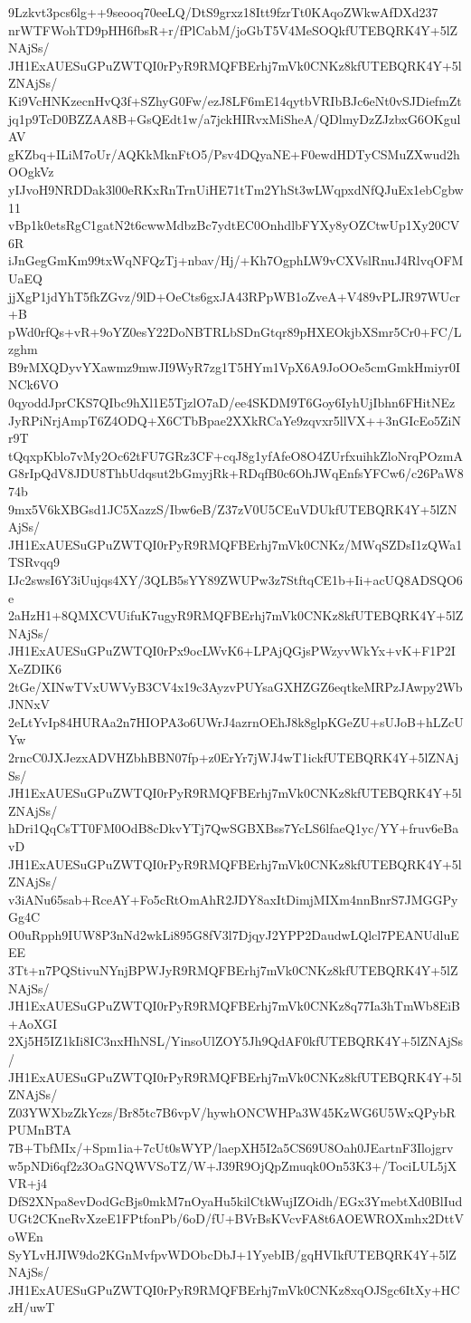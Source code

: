 9Lzkvt3pcs6lg++9seooq70eeLQ/DtS9grxz18Itt9fzrTt0KAqoZWkwAfDXd237
nrWTFWohTD9pHH6fbsR+r/fPlCabM/joGbT5V4MeSOQkfUTEBQRK4Y+5lZNAjSs/
JH1ExAUESuGPuZWTQI0rPyR9RMQFBErhj7mVk0CNKz8kfUTEBQRK4Y+5lZNAjSs/
Ki9VcHNKzecnHvQ3f+SZhyG0Fw/ezJ8LF6mE14qytbVRIbBJc6eNt0vSJDiefmZt
jq1p9TcD0BZZAA8B+GsQEdt1w/a7jckHIRvxMiSheA/QDlmyDzZJzbxG6OKgulAV
gKZbq+ILiM7oUr/AQKkMknFtO5/Psv4DQyaNE+F0ewdHDTyCSMuZXwud2hOOgkVz
yIJvoH9NRDDak3l00eRKxRnTrnUiHE71tTm2YhSt3wLWqpxdNfQJuEx1ebCgbw11
vBp1k0etsRgC1gatN2t6cwwMdbzBc7ydtEC0OnhdlbFYXy8yOZCtwUp1Xy20CV6R
iJnGegGmKm99txWqNFQzTj+nbav/Hj/+Kh7OgphLW9vCXVslRnuJ4RlvqOFMUaEQ
jjXgP1jdYhT5fkZGvz/9lD+OeCts6gxJA43RPpWB1oZveA+V489vPLJR97WUcr+B
pWd0rfQs+vR+9oYZ0esY22DoNBTRLbSDnGtqr89pHXEOkjbXSmr5Cr0+FC/Lzghm
B9rMXQDyvYXawmz9mwJI9WyR7zg1T5HYm1VpX6A9JoOOe5cmGmkHmiyr0INCk6VO
0qyoddJprCKS7QIbc9hXl1E5TjzlO7aD/ee4SKDM9T6Goy6IyhUjIbhn6FHitNEz
JyRPiNrjAmpT6Z4ODQ+X6CTbBpae2XXkRCaYe9zqvxr5llVX++3nGIcEo5ZiNr9T
tQqxpKblo7vMy2Oc62tFU7GRz3CF+cqJ8g1yfAfeO8O4ZUrfxuihkZloNrqPOzmA
G8rIpQdV8JDU8ThbUdqsut2bGmyjRk+RDqfB0c6OhJWqEnfsYFCw6/c26PaW874b
9mx5V6kXBGsd1JC5XazzS/Ibw6eB/Z37zV0U5CEuVDUkfUTEBQRK4Y+5lZNAjSs/
JH1ExAUESuGPuZWTQI0rPyR9RMQFBErhj7mVk0CNKz/MWqSZDsI1zQWa1TSRvqq9
IJc2swsI6Y3iUujqs4XY/3QLB5sYY89ZWUPw3z7StftqCE1b+Ii+acUQ8ADSQO6e
2aHzH1+8QMXCVUifuK7ugyR9RMQFBErhj7mVk0CNKz8kfUTEBQRK4Y+5lZNAjSs/
JH1ExAUESuGPuZWTQI0rPx9ocLWvK6+LPAjQGjsPWzyvWkYx+vK+F1P2IXeZDIK6
2tGe/XINwTVxUWVyB3CV4x19c3AyzvPUYsaGXHZGZ6eqtkeMRPzJAwpy2WbJNNxV
2eLtYvIp84HURAa2n7HIOPA3o6UWrJ4azrnOEhJ8k8glpKGeZU+sUJoB+hLZcUYw
2rncC0JXJezxADVHZbhBBN07fp+z0ErYr7jWJ4wT1ickfUTEBQRK4Y+5lZNAjSs/
JH1ExAUESuGPuZWTQI0rPyR9RMQFBErhj7mVk0CNKz8kfUTEBQRK4Y+5lZNAjSs/
hDri1QqCsTT0FM0OdB8cDkvYTj7QwSGBXBss7YcLS6lfaeQ1yc/YY+fruv6eBavD
JH1ExAUESuGPuZWTQI0rPyR9RMQFBErhj7mVk0CNKz8kfUTEBQRK4Y+5lZNAjSs/
v3iANu65sab+RceAY+Fo5cRtOmAhR2JDY8axItDimjMIXm4nnBnrS7JMGGPyGg4C
O0uRpph9IUW8P3nNd2wkLi895G8fV3l7DjqyJ2YPP2DaudwLQlcl7PEANUdluEEE
3Tt+n7PQStivuNYnjBPWJyR9RMQFBErhj7mVk0CNKz8kfUTEBQRK4Y+5lZNAjSs/
JH1ExAUESuGPuZWTQI0rPyR9RMQFBErhj7mVk0CNKz8q77Ia3hTmWb8EiB+AoXGI
2Xj5H5IZ1kIi8IC3nxHhNSL/YinsoUlZOY5Jh9QdAF0kfUTEBQRK4Y+5lZNAjSs/
JH1ExAUESuGPuZWTQI0rPyR9RMQFBErhj7mVk0CNKz8kfUTEBQRK4Y+5lZNAjSs/
Z03YWXbzZkYczs/Br85tc7B6vpV/hywhONCWHPa3W45KzWG6U5WxQPybRPUMnBTA
7B+TbfMIx/+Spm1ia+7cUt0sWYP/laepXH5I2a5CS69U8Oah0JEartnF3Ilojgrv
w5pNDi6qf2z3OaGNQWVSoTZ/W+J39R9OjQpZmuqk0On53K3+/TociLUL5jXVR+j4
DfS2XNpa8evDodGcBjs0mkM7nOyaHu5kilCtkWujIZOidh/EGx3YmebtXd0BlIud
UGt2CKneRvXzeE1FPtfonPb/6oD/fU+BVrBsKVcvFA8t6AOEWROXmhx2DttVoWEn
SyYLvHJIW9do2KGnMvfpvWDObcDbJ+1YyebIB/gqHVIkfUTEBQRK4Y+5lZNAjSs/
JH1ExAUESuGPuZWTQI0rPyR9RMQFBErhj7mVk0CNKz8xqOJSgc6ItXy+HCzH/uwT
